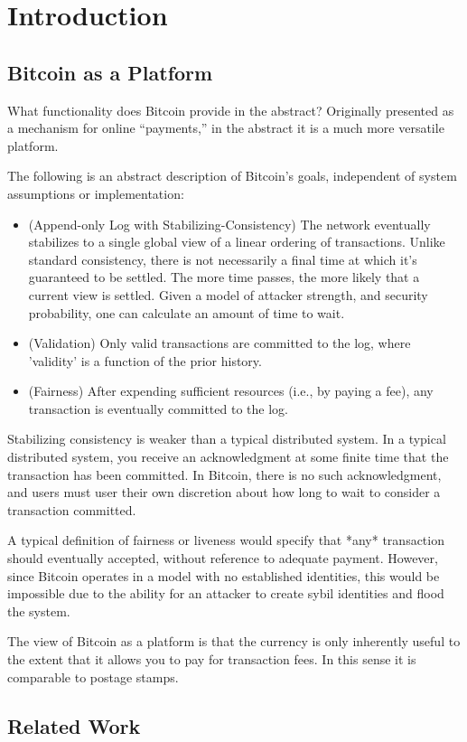 \section{Introduction}\label{intro}


\subsection{Bitcoin as a Platform}

What functionality does Bitcoin provide in the abstract? Originally presented as a mechanism for online ``payments,'' in the abstract it is a much more versatile platform.

The following is an abstract description of Bitcoin's goals, independent of system assumptions or implementation:
\begin{itemize}
\item (Append-only Log with Stabilizing-Consistency) The network eventually stabilizes to a single global view of a linear ordering of transactions. Unlike standard consistency, there is not necessarily a final time at which it's guaranteed to be settled. The more time passes, the more likely that a current view is settled. Given a model of attacker strength, and security probability, one can calculate an amount of time to wait.
\item (Validation) Only valid transactions are committed to the log, where 'validity' is a function of the prior history.
\item (Fairness) After expending sufficient resources (i.e., by paying a fee), any transaction is eventually committed to the log.
\end{itemize}

Stabilizing consistency is weaker than a typical distributed system. In a typical distributed system, you receive an acknowledgment at some finite time that the transaction has been committed. In Bitcoin, there is no such acknowledgment, and users must user their own discretion about how long to wait to consider a transaction committed.

A typical definition of fairness or liveness would specify that *any* transaction should eventually accepted, without reference to adequate payment. However, since Bitcoin operates in a model with no established identities, this would be impossible due to the ability for an attacker to create sybil identities and flood the system.

The view of Bitcoin as a platform is that the currency is only inherently useful to the extent that it allows you to pay for transaction fees. In this sense it is comparable to postage stamps.

\subsection{Related Work}
